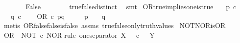 \begin{isabellebody}
\ \ \ \ \isamarkupfalse%
\ \isamarkupfalse%
\ False\isanewline
\ \ \ \ \ \ \isamarkupfalse%
\ true{\isacharunderscore}{\kern0pt}false{\isacharunderscore}{\kern0pt}distinct\ \isamarkupfalse%
\ smt\isanewline
{}\isamarkupfalse%
%
\endisatagproof
{\isafoldproof}%
%
\isadelimproof
\isanewline
%
\endisadelimproof
\isanewline
{}\isamarkupfalse%
\ OR{\isacharunderscore}{\kern0pt}true{\isacharunderscore}{\kern0pt}implies{\isacharunderscore}{\kern0pt}one{\isacharunderscore}{\kern0pt}is{\isacharunderscore}{\kern0pt}true{\isacharcolon}{\kern0pt}\isanewline
\ \ \ {\isachardoublequoteopen}p\ {\isasymin}\isactrlsub c\ {\isasymOmega}{\isachardoublequoteclose}\ \isanewline
\ \ \ {\isachardoublequoteopen}q\ {\isasymin}\isactrlsub c\ {\isasymOmega}{\isachardoublequoteclose}\isanewline
\ \ \ {\isachardoublequoteopen}OR\ {\isasymcirc}\isactrlsub c\ {\isasymlangle}p{\isacharcomma}{\kern0pt}q{\isasymrangle}\ {\isacharequal}{\kern0pt}\ {\isasymt}{\isachardoublequoteclose}\isanewline
\ \ \ {\isachardoublequoteopen}{\isacharparenleft}{\kern0pt}p\ {\isacharequal}{\kern0pt}\ {\isasymt}{\isacharparenright}{\kern0pt}\ {\isasymor}\ {\isacharparenleft}{\kern0pt}q\ {\isacharequal}{\kern0pt}\ {\isasymt}{\isacharparenright}{\kern0pt}{\isachardoublequoteclose}\isanewline
%
\isadelimproof
\ \ %
\endisadelimproof
%
\isatagproof
{}\isamarkupfalse%
\ {\isacharparenleft}{\kern0pt}metis\ OR{\isacharunderscore}{\kern0pt}false{\isacharunderscore}{\kern0pt}false{\isacharunderscore}{\kern0pt}is{\isacharunderscore}{\kern0pt}false\ assms\ true{\isacharunderscore}{\kern0pt}false{\isacharunderscore}{\kern0pt}only{\isacharunderscore}{\kern0pt}truth{\isacharunderscore}{\kern0pt}values{\isacharparenright}{\kern0pt}%
\endisatagproof
{\isafoldproof}%
%
\isadelimproof
\isanewline
%
\endisadelimproof
\isanewline
{}\isamarkupfalse%
\ NOT{\isacharunderscore}{\kern0pt}NOR{\isacharunderscore}{\kern0pt}is{\isacharunderscore}{\kern0pt}OR{\isacharcolon}{\kern0pt}\isanewline
\ {\isachardoublequoteopen}OR\ {\isacharequal}{\kern0pt}\ NOT\ {\isasymcirc}\isactrlsub c\ NOR{\isachardoublequoteclose}\isanewline
%
\isadelimproof
%
\endisadelimproof
%
\isatagproof
{}\isamarkupfalse%
{\isacharparenleft}{\kern0pt}rule\ one{\isacharunderscore}{\kern0pt}separator{\isacharbrackleft}{\kern0pt}\ X\ {\isacharequal}{\kern0pt}\ {\isachardoublequoteopen}{\isasymOmega}\ {\isasymtimes}\isactrlsub c\ {\isasymOmega}{\isachardoublequoteclose}{\isacharcomma}{\kern0pt}\ \ Y\ {\isacharequal}{\kern0pt}\ {\isasymOmega}{\isacharbrackright}{\kern0pt}{\isacharparenright}{\kern0pt}\isanewline

\end{isabellebody}
